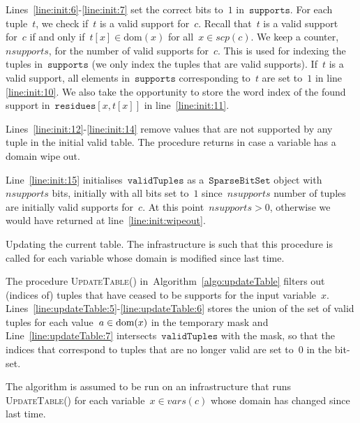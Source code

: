 \documentclass[a4paper,11pt]{article}
\newcommand{\Algoref}[1]{Algorithm~\ref{#1}}
\newcommand{\Lineref}[1]{Line~\ref{#1}}
\newcommand{\Linesref}[2]{Lines~\ref{#1}-\ref{#2}}
\newcommand{\Dom}[1]{\text{dom}({#1})}
\newcommand{\SparseBitSet}{\texttt{SparseBitSet}}
\newcommand{\CurrTable}{\texttt{validTuples}}
\newcommand{\Supports}{\texttt{supports}}
\newcommand{\Residues}{\texttt{residues}}
\def\UpdateTable{\textsc{UpdateTable}}
\newcommand{\localvar}[1]{\mathit{#1}}
\numberwithin{equation}{section}
\begin{document}
\Linesref{line:init:6}{line:init:7} set the correct bits to~$1$ in~$\Supports$.
For each tuple~$t$, we check if~$t$ is a valid support for~$c$. Recall that~$t$ is
a valid support for~$c$ if and only if~$t[x] \in \Dom{x}$ for all~$x \in scp(c)$.
We keep a counter,~$nsupports$, for the number of valid supports for~$c$.
This is used for indexing the tuples in~$\Supports$ (we only index the tuples
that are valid supports).
If~$t$ is a valid support,
all elements in~$\Supports$ corresponding to~$t$ are set to~$1$ in
line \ref{line:init:10}. We also take the opportunity to store the word index
of the found support in~$\Residues[x,t[x]]$
in line~\ref{line:init:11}.

\Linesref{line:init:12}{line:init:14} remove values that are not supported
by any tuple in the initial valid table. The procedure returns in case a variable
has a domain wipe out.

\Lineref{line:init:15} initialises~$\CurrTable$ as a~$\SparseBitSet$ object with
$nsupports$ bits, initially with all bits set to~$1$ since~$nsupports$
number of tuples are initially valid supports for~$c$.
At this point~$\localvar{nsupports} > 0$,
otherwise we would have returned at line~\ref{line:init:wipeout}.

  \begin{algorithm}[H]
  \begin{algorithmic}[1]  %
    
  \end{algorithmic}
  \caption{Updating the current table. The infrastructure
  is such that this procedure is called for each variable whose domain is
  modified since last time.}
  \label{algo:updateTable}
\end{algorithm}

  The procedure \UpdateTable() in~\Algoref{algo:updateTable}
  filters out (indices of)
  tuples that have ceased to be supports for the input variable~$x$.
  \Linesref{line:updateTable:5}{line:updateTable:6} stores the union of the
  set of valid tuples for each value~$a \in \text{dom}(x)$ in the temporary mask
  and \Lineref{line:updateTable:7} intersects~$\CurrTable$ with the mask,
  so that the indices that correspond to tuples that are no longer valid
  are set to~$0$ in the bit-set.

  The algorithm is assumed to be run on an infrastructure that runs \UpdateTable()
  for each variable~$x \in vars(c)$ whose domain has changed since last time.
  
\end{document}
